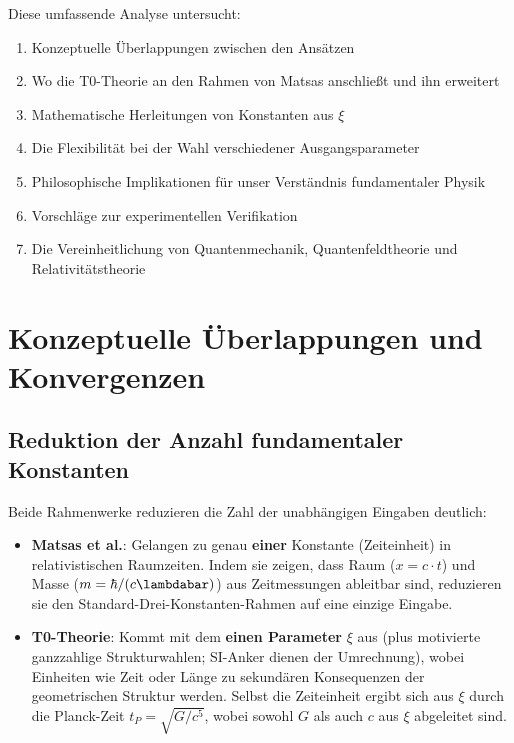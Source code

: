 	Diese umfassende Analyse untersucht:
	\begin{enumerate}
		\item Konzeptuelle Überlappungen zwischen den Ansätzen
		\item Wo die T0-Theorie an den Rahmen von Matsas anschließt und ihn erweitert
		\item Mathematische Herleitungen von Konstanten aus $\xi$
		\item Die Flexibilität bei der Wahl verschiedener Ausgangsparameter
		\item Philosophische Implikationen für unser Verständnis fundamentaler Physik
		\item Vorschläge zur experimentellen Verifikation
		\item Die Vereinheitlichung von Quantenmechanik, Quantenfeldtheorie und Relativitätstheorie
	\end{enumerate}
	
	\section{Konzeptuelle Überlappungen und Konvergenzen}
	
	\subsection{Reduktion der Anzahl fundamentaler Konstanten}
	
	Beide Rahmenwerke reduzieren die Zahl der unabhängigen Eingaben deutlich:
	
	\begin{itemize}
		\item \textbf{Matsas et al.}: Gelangen zu genau \textbf{einer} Konstante (Zeiteinheit) in relativistischen Raumzeiten. Indem sie zeigen, dass Raum ($x = c \cdot t$) und Masse ($m = \hbar / (c \lambdabar)$) aus Zeitmessungen ableitbar sind, reduzieren sie den Standard-Drei-Konstanten-Rahmen auf eine einzige Eingabe.
		
		\item \textbf{T0-Theorie}: Kommt mit dem \textbf{einen Parameter} $\xi$ aus (plus motivierte ganzzahlige Strukturwahlen; SI-Anker dienen der Umrechnung), wobei Einheiten wie Zeit oder Länge zu sekundären Konsequenzen der geometrischen Struktur werden. Selbst die Zeiteinheit ergibt sich aus $\xi$ durch die Planck-Zeit $t_P = \sqrt{G/c^5}$, wobei sowohl $G$ als auch $c$ aus $\xi$ abgeleitet sind.
	\end{itemize}
	
